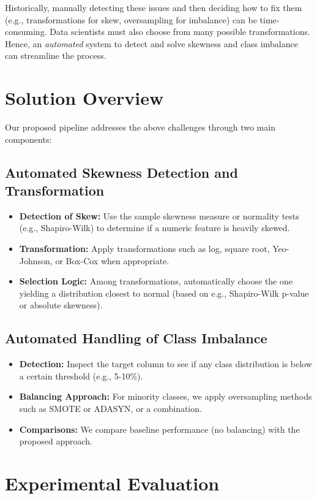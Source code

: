 \documentclass[11pt]{article}
\begin{document}
Historically, manually detecting these issues and then deciding how to fix them (e.g., transformations for skew, oversampling for imbalance) can be time-consuming. Data scientists must also choose from many possible transformations. Hence, an \textit{automated} system to detect and solve skewness and class imbalance can streamline the process.

\section{Solution Overview}
Our proposed pipeline addresses the above challenges through two main components:

\subsection{Automated Skewness Detection and Transformation}
\begin{itemize}
    \item \textbf{Detection of Skew:} Use the sample skewness measure or normality tests (e.g., Shapiro-Wilk) to determine if a numeric feature is heavily skewed.
    \item \textbf{Transformation:} Apply transformations such as log, square root, Yeo-Johnson, or Box-Cox when appropriate.
    \item \textbf{Selection Logic:} Among transformations, automatically choose the one yielding a distribution closest to normal (based on e.g., Shapiro-Wilk p-value or absolute skewness).
\end{itemize}

\subsection{Automated Handling of Class Imbalance}
\begin{itemize}
    \item \textbf{Detection:} Inspect the target column to see if any class distribution is below a certain threshold (e.g., 5-10\%).
    \item \textbf{Balancing Approach:} For minority classes, we apply oversampling methods such as SMOTE or ADASYN, or a combination.
    \item \textbf{Comparisons:} We compare baseline performance (no balancing) with the proposed approach.
\end{itemize}

\section{Experimental Evaluation}
\end{document}

